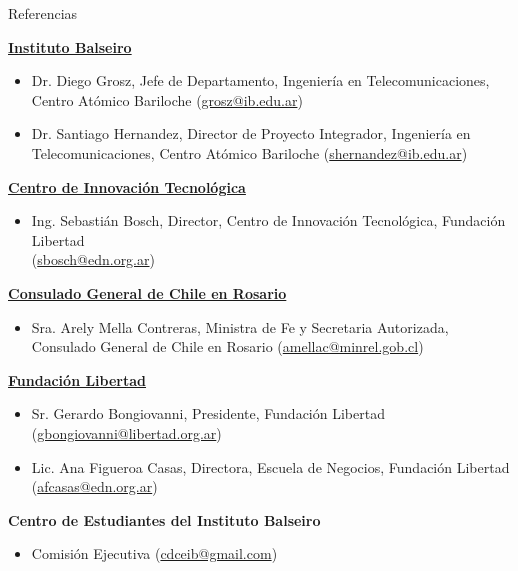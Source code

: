 \documentclass{resume} %
\begin{document}
\begin{rSection}{Referencias}
    \begin{enumerate}[label={[\arabic*]}]
        \item \label{ib} \href{https://www.ib.edu.ar/}{\textbf{Instituto Balseiro}}
              \begin{itemize}
                  \item Dr. Diego Grosz, Jefe de Departamento, Ingeniería en Telecomunicaciones, Centro Atómico Bariloche (\href{mailto:grosz@ib.edu.ar}{grosz@ib.edu.ar})
                  \item Dr. Santiago Hernandez, Director de Proyecto Integrador,  Ingeniería en Telecomunicaciones,  Centro  Atómico Bariloche (\href{mailto:shernandez@ib.edu.ar}{shernandez@ib.edu.ar})
              \end{itemize}
        \item \label{cit} \href{https://www.centroit.org.ar/}{\textbf{Centro de Innovación Tecnológica}}
              \begin{itemize}
                  \item Ing. Sebastián Bosch, Director, Centro de Innovación Tecnológica, Fundación Libertad\\(\href{mailto:sbosch@edn.org.ar}{sbosch@edn.org.ar})
              \end{itemize}
        \item \label{chile} \href{https://chile.gob.cl/rosario/}{\textbf{Consulado General de Chile en Rosario}}
              \begin{itemize}
                  \item Sra. Arely Mella Contreras, Ministra de Fe y Secretaria Autorizada, Consulado General de Chile en Rosario (\href{mailto:amellac@minrel.gob.cl}{amellac@minrel.gob.cl})
              \end{itemize}
        \item \label{funlib} \href{https://libertad.org.ar/}{\textbf{Fundación Libertad}}
              \begin{itemize}
                  \item Sr. Gerardo Bongiovanni, Presidente, Fundación Libertad (\href{mailto:gbongiovanni@libertad.org.ar}{gbongiovanni@libertad.org.ar})
                  \item Lic. Ana Figueroa Casas, Directora, Escuela de Negocios, Fundación Libertad\\(\href{mailto:afcasas@edn.org.ar}{afcasas@edn.org.ar})
              \end{itemize}
        \item \label{ceib} \textbf{Centro de Estudiantes del Instituto Balseiro}
              \begin{itemize}
                  \item Comisión Ejecutiva (\href{mailto:cdceib@gmail.com}{cdceib@gmail.com})
              \end{itemize}
    \end{enumerate}

\end{rSection}

\end{document}
